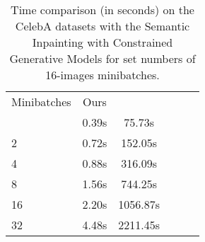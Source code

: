 \begin{table}[t]
	\centering
	\begin{tabular}{l c c c c c }
		\Bigrule
		Minibatches & Ours & \citet{Yeh2017} \\
		\bigrule
		1&0.39s&75.73s
\\
		2&0.72s&152.05s
 \\
		4&0.88s&316.09s
 \\
		8&1.56s&744.25s
\\
		16&2.20s&1056.87s \\

		32&4.48s&2211.45s \\
	\end{tabular}
	
	\caption[Time comparison on the CelebA datasets]{Time comparison (in seconds) on the CelebA datasets with the Semantic Inpainting with Constrained Generative Models \citep{Yeh2017} for set numbers of 16-images minibatches.}
	\label{tab:times}
\end{table}

